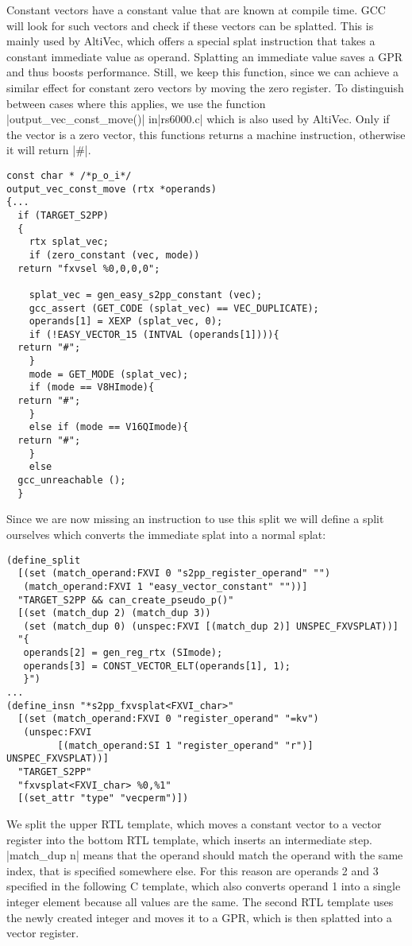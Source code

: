 Constant vectors have a constant value that are known at compile time.
GCC will look for such vectors and check if these vectors can be splatted.
This is mainly used by AltiVec, which offers a special splat instruction that takes a constant immediate value as operand.
Splatting an immediate value saves a GPR and thus boosts performance.
Still, we keep this function, since we can achieve a similar effect for constant zero vectors by moving the zero register.
To distinguish between cases where this applies, we use the function |output_vec_const_move()| in|rs6000.c| which is also used by AltiVec.
Only if the vector is a zero vector, this functions returns a machine instruction, otherwise it will return |#|.
\begin{lstlisting}
const char * /*p_o_i*/
output_vec_const_move (rtx *operands)
{...
  if (TARGET_S2PP)
  {
    rtx splat_vec;
    if (zero_constant (vec, mode))
  return "fxvsel %0,0,0,0";

    splat_vec = gen_easy_s2pp_constant (vec);
    gcc_assert (GET_CODE (splat_vec) == VEC_DUPLICATE);
    operands[1] = XEXP (splat_vec, 0);
    if (!EASY_VECTOR_15 (INTVAL (operands[1]))){
  return "#";
    }
    mode = GET_MODE (splat_vec);
    if (mode == V8HImode){
  return "#";
    }
    else if (mode == V16QImode){
  return "#";
    }
    else
  gcc_unreachable ();
  }
\end{lstlisting}

Since we are now missing an instruction to use this split we will define a split ourselves which converts the immediate splat into a normal splat:
\begin{lstlisting}
(define_split
  [(set (match_operand:FXVI 0 "s2pp_register_operand" "")
   (match_operand:FXVI 1 "easy_vector_constant" ""))]
  "TARGET_S2PP && can_create_pseudo_p()"
  [(set (match_dup 2) (match_dup 3))
   (set (match_dup 0) (unspec:FXVI [(match_dup 2)] UNSPEC_FXVSPLAT))]
  "{
   operands[2] = gen_reg_rtx (SImode);
   operands[3] = CONST_VECTOR_ELT(operands[1], 1);
   }")
...
(define_insn "*s2pp_fxvsplat<FXVI_char>"
  [(set (match_operand:FXVI 0 "register_operand" "=kv")
   (unspec:FXVI
         [(match_operand:SI 1 "register_operand" "r")] UNSPEC_FXVSPLAT))]
  "TARGET_S2PP"
  "fxvsplat<FXVI_char> %0,%1"
  [(set_attr "type" "vecperm")])
\end{lstlisting}

We split the upper RTL template, which moves a constant vector to a vector register into the bottom RTL template, which inserts an intermediate step.
|match_dup n| means that the operand should match the operand with the same index, that is specified somewhere else.
For this reason are operands 2 and 3 specified in the following C template, which also converts operand 1 into a single integer element because all values are the same.
The second RTL template uses the newly created integer and moves it to a GPR, which is then splatted into a vector register.

